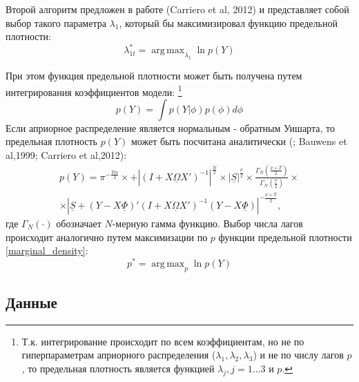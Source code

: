 \documentclass[11pt]{article} %
\DeclareMathOperator*{\argmax}{arg\,max}
\begin{document}
Второй алгоритм предложен в работе (Carriero et al, 2012) и представляет собой выбор такого параметра $\lambda_1$, который бы максимизировал функцию предельной плотности:
\begin{equation}
\lambda_{1t}^*=\argmax_{\lambda_1} \ln p(Y)
\end{equation}

При этом функция предельной плотности может быть получена путем интегрирования коэффициентов модели: \footnote{Т.к. интегрирование происходит по  всем коэффициентам, но не по гиперпараметрам априорного распределения ($\lambda_1,\lambda_2,\lambda_3$)  и не по числу лагов $p$, то предельная плотность является функцией $\lambda_j,j=1\ldots 3$ и $p$.}
\begin{equation}
p(Y)=\int p(Y|\phi)p(\phi) d \phi
\end{equation}
Если априорное распределение является нормальным - обратным Уишарта, то предельная плотность $p(Y)$ может быть посчитана аналитически (\cite{zellner_1996_introduction}; Bauwens et al,1999; Carriero et al,2012):
\begin{multline}
p(Y)=\pi^{-\frac{Tm}{2}}\times +\left |(I+X\underline{\Omega} X')^{-1}\right|^{\frac{N}{2}}\times |\underline{S}|^{\frac{\underline{\nu}}{2}}\times \frac{\Gamma_N(\frac{\underline{\nu}+T}{2})}{\Gamma_N(\frac{\underline{\nu}}{2})}\times \\ \times
\left|\underline{S}+(Y-X\underline{\Phi})'(I+X\underline{\Omega} X')^{-1}(Y-X\underline{\Phi})\right|^{-\frac{\underline{\nu}+T}{2}},\label{marginal_density}
\end{multline}
где $\Gamma_N(\cdot)$ обозначает $N$-мерную гамма функцию.
Выбор числа лагов происходит аналогично путем максимизации по $p$ функции предельной плотности \eqref{marginal_density}: 
\begin{equation}
p^*=\argmax_{p} \ln p(Y)
\end{equation} 

\subsection{Данные}
\end{document}
